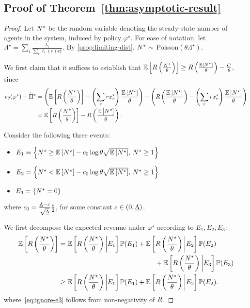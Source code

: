 \documentclass[12pt]{article}
\begin{document}
\subsection{Proof of Theorem~\ref{thm:asymptotic-result}}
\begin{proof}
Let ${N}^\star$ be the random variable denoting the steady-state number of agents in the system, induced by policy $\varphi^\star$. For ease of notation, let $\Lambda^\star = \sum_i \frac{\lambda_i}{\sum_r \ell_i(r)x_r^\star}$. By \cref{prop:limiting-dist}, ${N}^\star \sim$ Poisson$(\theta\Lambda^\star)$.

We first claim that it suffices to establish that 
$\mathbb{E}\left[R\left(\frac{{N}^\star}{\theta}\right)\right] \geq R\left(\frac{\mathbb{E}\left[{N}^\star\right]}{\theta}\right)-\frac{C}{{\theta}},$
since 
\begin{align*}
    v_{\theta}(\varphi^\star)-\widetilde{\Pi}^* &= \left(\mathbb{E}\left[R\left(\frac{{N}^\star}{\theta}\right)\right]-\left(\sum_r r x_r^\star\right)\frac{\mathbb{E}\left[{N}^\star\right]}{\theta}\right) - \left(R\left(\frac{\mathbb{E}\left[{N}^\star\right]}{\theta}\right)-\left(\sum_r r x_r^\star\right)\frac{\mathbb{E}\left[{N}^\star\right]}{\theta}\right) \\
    &= \mathbb{E}\left[R\left(\frac{{N}^\star}{\theta}\right)\right]-R\left(\frac{\mathbb{E}\left[{N}^\star\right]}{\theta}\right).
\end{align*}


 Consider the following three events:
{
\begin{itemize}
\item $E_1 = \left\{{N}^\star \geq \mathbb{E}\left[{N}^\star\right] - {c_0}\log\theta\sqrt{\mathbb{E}\left[{N}^\star\right]},\,{N}^\star \geq 1\right\}$
\item $E_2 = \left\{ {N}^\star < \mathbb{E}\left[{N}^\star\right] - {c_0}\log\theta\sqrt{\mathbb{E}\left[{N}^\star\right]},\,{N}^\star \geq 1 \right\}$
\item $E_3 = \left\{{N}^\star = 0\right\}$ 
\end{itemize}
where $c_0 = \frac{\underline{\Lambda}-\varepsilon}{\sqrt{\underline{\Lambda}}}\frac{e}{2}$, for some constant $\varepsilon \in (0,\underline{\Lambda})$. 
}

We first decompose the expected revenue under $\varphi^\star$ according to $E_1, E_2, E_3$:
\begin{align}
    \EE\left[\rev\left(\frac{\randomstate^\star}{\theta}\right)\right] &= \EE\left[\rev\left(\frac{\randomstate^\star}{\theta}\right)\bigg{|} E_1\right]\PP(E_1) + \EE\left[\rev\left(\frac{\randomstate^\star}{\theta}\right)\bigg{|} E_2\right]\PP(E_2) \notag \\
    &\hspace{5cm}+ \EE\left[\rev\left(\frac{\randomstate^\star}{\theta}\right)\bigg{|} E_3\right]\PP(E_3) \notag \\
    & \geq \EE\left[\rev\left(\frac{\randomstate^\star}{\theta}\right)\bigg{|} E_1\right]\PP(E_1) + \EE\left[\rev\left(\frac{\randomstate^\star}{\theta}\right)\bigg{|} E_2\right]\PP(E_2). \label{eq:ignore-e3} 
\end{align}
where~\eqref{eq:ignore-e3} follows from non-negativity of $R$.


\end{proof}
\end{document}
